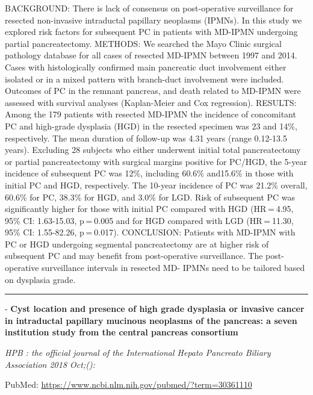 \documentclass[]{article}
\begin{document}
BACKGROUND: There is lack of consensus on post-operative surveillance
for resected non-invasive intraductal papillary neoplasms (IPMNs). In
this study we explored risk factors for subsequent PC in patients with
MD-IPMN undergoing partial pancreatectomy. METHODS: We searched the Mayo
Clinic surgical pathology database for all cases of resected MD-IPMN
between 1997 and 2014. Cases with histologically confirmed main
pancreatic duct involvement either isolated or in a mixed pattern with
branch-duct involvement were included. Outcomes of PC in the remnant
pancreas, and death related to MD-IPMN were assessed with survival
analyses (Kaplan-Meier and Cox regression). RESULTS: Among the 179
patients with resected MD-IPMN the incidence of concomitant PC and
high-grade dysplasia (HGD) in the resected specimen was 23 and 14\%,
respectively. The mean duration of follow-up was 4.31 years (range
0.12-13.5 years). Excluding 28 subjects who either underwent initial
total pancreatectomy or partial pancreatectomy with surgical margins
positive for PC/HGD, the 5-year incidence of subsequent PC was 12\%,
including 60.6\% and15.6\% in those with initial PC and HGD,
respectively. The 10-year incidence of PC was 21.2\% overall, 60.6\% for
PC, 38.3\% for HGD, and 3.0\% for LGD. Risk of subsequent PC was
significantly higher for those with initial PC compared with HGD
(HR = 4.95, 95\% CI: 1.63-15.03, p = 0.005 and for HGD compared with LGD
(HR = 11.30, 95\% CI: 1.55-82.26, p = 0.017). CONCLUSION: Patients with
MD-IPMN with PC or HGD undergoing segmental pancreatectomy are at higher
risk of subsequent PC and may benefit from post-operative surveillance.
The post-operative surveillance intervals in resected MD- IPMNs need to
be tailored based on dysplasia grade.

{}

{}

\begin{center}\rule{0.5\linewidth}{\linethickness}\end{center}

 - \textbf{Cyst location and presence of high grade dysplasia or
invasive cancer in intraductal papillary mucinous neoplasms of the
pancreas: a seven institution study from the central pancreas
consortium}

\emph{HPB : the official journal of the International Hepato Pancreato
Biliary Association 2018 Oct;():}

PubMed: \url{https://www.ncbi.nlm.nih.gov/pubmed/?term=30361110}
\end{document}

